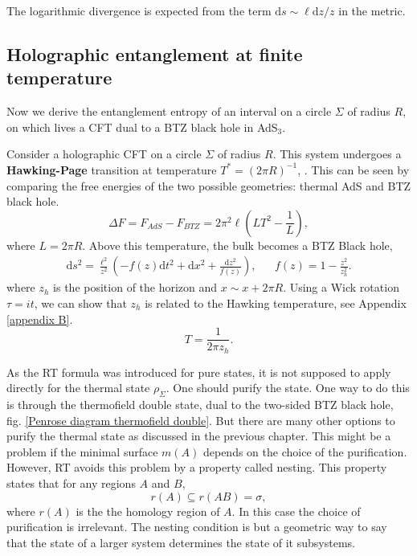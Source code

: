 The logarithmic divergence is expected from the term $\text{d}s\sim \ell \text{d}z/z$ in the metric.

\subsection{Holographic entanglement at finite temperature}

Now we derive the entanglement entropy of an interval on a circle $\Sigma$ of radius $R$, on which lives a CFT dual to a BTZ black hole in AdS$_3$.

Consider a holographic CFT on a circle $\Sigma$ of radius $R$. This system undergoes a \textbf{Hawking-Page} transition at temperature $T^*=\left(2\pi R\right)^{-1}$, \cite{Hawking1983}. This can be seen by comparing the free energies of the two possible geometries: thermal AdS and BTZ black hole. 
\begin{equation}
    \Delta F = F_{AdS}-F_{BTZ} = 2\pi^2\ell(LT^2-\frac{1}{L}),
\end{equation}
where $L=2\pi R$. Above this temperature, the bulk becomes a BTZ Black hole\cite{Ba_ados_1992},
\begin{align}\label{BTZ}
    \text{d}s^2 = \frac{\ell^2}{z^2}\left(-f\left(z\right)\text{d}t^2+\text{d}x^2+\frac{\text{d}z^2}{f\left(z\right)}\right),     &&      f\left(z\right)=1-\frac{z^2}{z_h^2}.
\end{align}
where $z_h$ is the position of the horizon and $x\sim x+2\pi R$. Using a Wick rotation $\tau=it$, we can show that $z_h$ is related to the Hawking temperature, see Appendix \ref{appendix B}.
\begin{equation}\label{Haking temperature}
    T = \frac{1}{2\pi z_h}.
\end{equation}

As the RT formula was introduced for pure states, it is not supposed to apply directly for the thermal state $\rho_\Sigma$. One should purify the state. One way to do this is through the thermofield double state, dual to the two-sided BTZ black hole, fig. \ref{Penrose diagram thermofield double}. But there are many other options to purify the thermal state as discussed in the previous chapter. This might be a problem if the minimal surface $m(A)$ depends on the choice of the purification. However, RT avoids this problem by a property called nesting. This property states that for any regions $A$ and $B$,
\begin{equation}
    r\left(A\right) \subseteq r\left(AB\right) = \sigma,
\end{equation}
where $r(A)$ is the the homology region of $A$. In this case the choice of purification is irrelevant. The nesting condition is but a geometric way to say that the state of a larger system determines the state of it subsystems.

